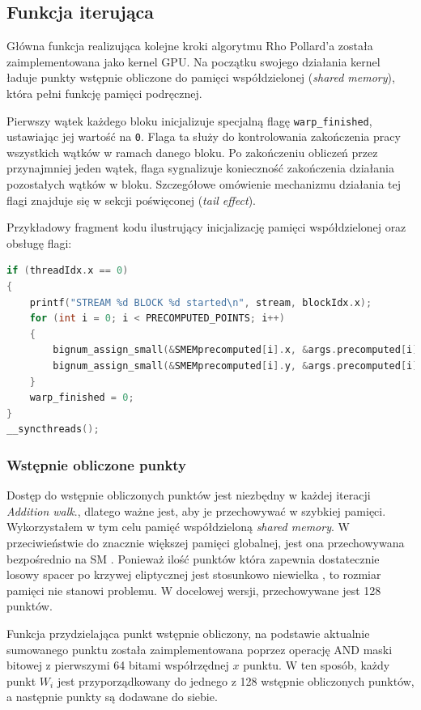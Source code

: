 \subsection{Funkcja iterująca}

Główna funkcja realizująca kolejne kroki algorytmu Rho Pollard'a została
zaimplementowana jako kernel GPU. Na początku swojego działania kernel ładuje
punkty wstępnie obliczone do pamięci współdzielonej (\textit{shared memory}),
która pełni funkcję pamięci podręcznej.

Pierwszy wątek każdego bloku inicjalizuje specjalną flagę \texttt{warp\_finished},
ustawiając jej wartość na \texttt{0}. Flaga ta służy do kontrolowania zakończenia
pracy wszystkich wątków w ramach danego bloku. Po zakończeniu obliczeń przez
przynajmniej jeden wątek, flaga sygnalizuje konieczność zakończenia działania
pozostałych wątków w bloku. Szczegółowe omówienie mechanizmu działania tej flagi
znajduje się w sekcji poświęconej (\textit{tail effect}).

Przykładowy fragment kodu ilustrujący inicjalizację pamięci współdzielonej oraz
obsługę flagi:

\begin{lstlisting}[language=C, caption=Inicjalizacja pamięci współdzielonej i flagi \texttt{warp\_finished}]
if (threadIdx.x == 0)
{
    printf("STREAM %d BLOCK %d started\n", stream, blockIdx.x);
    for (int i = 0; i < PRECOMPUTED_POINTS; i++)
    {
        bignum_assign_small(&SMEMprecomputed[i].x, &args.precomputed[i].x);
        bignum_assign_small(&SMEMprecomputed[i].y, &args.precomputed[i].y);
    }
    warp_finished = 0;
}
__syncthreads();
\end{lstlisting}

\subsubsection{Wstępnie obliczone punkty}
Dostęp do wstępnie obliczonych punktów jest niezbędny w każdej iteracji \textit{Addition walk}.,
dlatego ważne jest, aby je przechowywać w szybkiej pamięci. Wykorzystałem w tym celu pamięć współdzieloną \textit{shared memory}.
W przeciwieństwie do znacznie większej pamięci globalnej, jest ona przechowywana bezpośrednio na SM \cite{Cheng2014,Jason2011}.
Ponieważ ilość punktów która zapewnia dostatecznie losowy spacer po krzywej eliptycznej
jest stosunkowo niewielka \cite{Teske2000},
to rozmiar pamięci nie stanowi problemu. W docelowej wersji, przechowywane jest 128 punktów.
\par
Funkcja przydzielająca punkt wstępnie obliczony, na podstawie aktualnie sumowanego punktu została zaimplementowana
poprzez operację AND maski bitowej z pierwszymi 64 bitami współrzędnej
$x$ punktu.
W ten sposób, każdy punkt $W_i$ jest przyporządkowany do jednego z 128 wstępnie obliczonych punktów,
a następnie punkty są dodawane do siebie.

